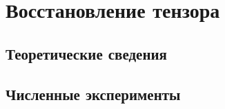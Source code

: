 \section{Восстановление тензора}
	 \subsection{Теоретические сведения}
\clearpage
	  \subsection{Численные эксперименты}

